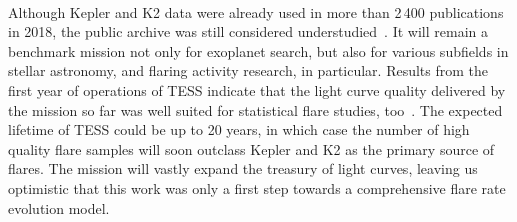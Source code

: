 \documentclass{aa}
\begin{document}
\\
Although Kepler and K2 data were already used in more than 2\,400 publications in 2018, the public archive was still considered understudied~\citep{barentsen_retirement_opportunities_2018}. It will remain a benchmark mission not only for exoplanet search, but also for various subfields in stellar astronomy, and flaring activity research, in particular. Results from the first year of operations of TESS indicate that the light curve quality delivered by the mission so far was well suited for statistical flare studies, too~\citep{doyle2020,guenther2020, feinstein2020}. The expected lifetime of TESS could be up to 20 years, in which case the number of high quality flare samples will soon outclass Kepler and K2 as the primary source of flares. The mission will vastly expand the treasury of light curves, leaving us optimistic that this work was only a first step towards a comprehensive flare rate evolution model. %
\end{document}
